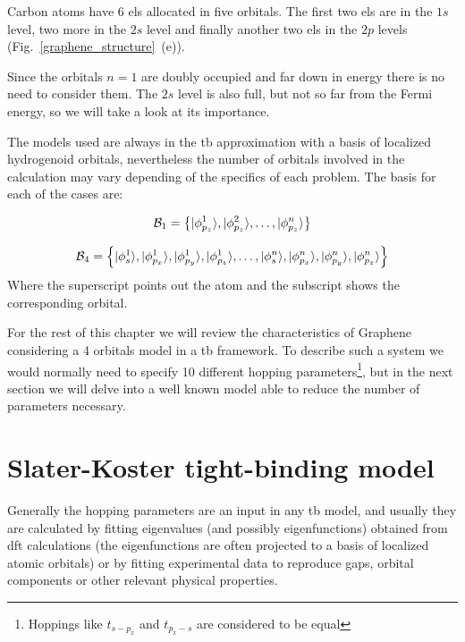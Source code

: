 Carbon atoms have 6 \acp{el} allocated in five orbitals. The first two \acp{el} are in the $1s$ level, two more in the $2s$ level and finally another two \acp{el} in the $2p$ levels (Fig.~\ref{graphene_structure}~(e)).

Since the orbitals $n=1$ are doubly occupied and far down in energy there is no need to consider them. The $2s$ level is also full, but not so far from the Fermi energy, so we will take a look at its importance.

The models used are always in the \ac{tb} approximation with a basis of localized hydrogenoid orbitals, nevertheless the number of orbitals involved in the calculation may vary depending of the specifics of each problem. The basis for each of the cases are:

\begin{equation}
  \mathcal{B}_1 = \left\{|\phi^1_{p_z}\rangle, |\phi^2_{p_z}\rangle,\dots, |\phi^n_{p_z}\rangle\right\}
\label{basis1}
\end{equation}

\begin{equation}
  \mathcal{B}_4 = \left\{
  |\phi^1_{s}\rangle,|\phi^1_{p_x}\rangle,|\phi^1_{p_y}\rangle,|\phi^1_{p_z}\rangle,
  \dots,
  |\phi^n_{s}\rangle,|\phi^n_{p_x}\rangle,|\phi^n_{p_y}\rangle,|\phi^n_{p_z}\rangle
  \right\}
\label{basis4}
\end{equation}
Where the superscript points out the atom and the subscript shows the corresponding orbital.

For the rest of this chapter we will review the characteristics of Graphene considering a 4 orbitals model in a \ac{tb} framework.
To describe such a system we would normally need to specify 10 different hopping parameters\footnote{Hoppings like $t_{s-p_x}$ and $t_{p_x-s}$ are considered to be equal}, but in the next section we will delve into a well known model able to reduce the number of parameters necessary.

%




\section{Slater-Koster tight-binding model}
\label{sec:SK}
Generally the hopping parameters are an input in any \ac{tb} model, and usually they are calculated by fitting eigenvalues (and possibly eigenfunctions) obtained from \ac{dft} calculations (the eigenfunctions are often projected to a basis of localized atomic orbitals) or by fitting experimental data to reproduce gaps, orbital components or other relevant physical properties.


